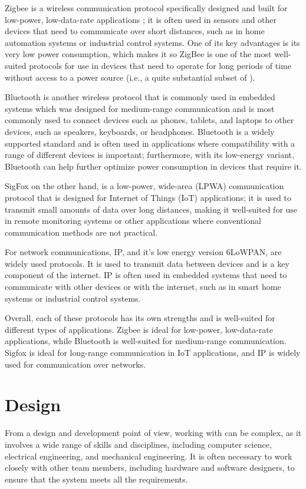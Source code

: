 Zigbee is a wireless communication protocol specifically designed and built for low-power, low-data-rate applications \cite{Zigbee}; it is often used in sensors and other devices that need to communicate over short distances, such as in home automation systems or industrial control systems. One of its key advantages is its very low power consumption, which makes it so ZigBee is one of the most well-suited protocols for use in devices that need to operate for long periods of time without access to a power source (i.e., a quite substantial subset of \ess).

Bluetooth is another wireless protocol that is commonly used in embedded systems which was designed for medium-range communication and is most commonly used to connect devices such as phones, tablets, and laptops to other devices, such as speakers, keyboards, or headphones. Bluetooth is a widely supported standard and is often used in applications where compatibility with a range of different devices is important; furthermore, with its low-energy variant, Bluetooth can help further optimize power consumption in devices that require it.

SigFox on the other hand, is a low-power, wide-area (LPWA) communication protocol that is designed for Internet of Things (IoT) applications; it is used to transmit small amounts of data over long distances, making it well-suited for use in remote monitoring systems or other applications where conventional communication methods are not practical.

For network communications, IP, and it's low energy version 6LoWPAN, are widely used protocols. It is used to transmit data between devices and is a key component of the internet. IP is often used in embedded systems that need to communicate with other devices or with the internet, such as in smart home systems or industrial control systems.

Overall, each of these protocols has its own strengths and is well-suited for different types of applications. Zigbee is ideal for low-power, low-data-rate applications, while Bluetooth is well-suited for medium-range communication. Sigfox is ideal for long-range communication in IoT applications, and IP is widely used for communication over networks.



\section{Design}
From a design and development point of view, working with \ess can be complex, as it involves a wide range of skills and disciplines, including computer science, electrical engineering, and mechanical engineering. It is often necessary to work closely with other team members, including hardware and software designers, to ensure that the system meets all the requirements.

